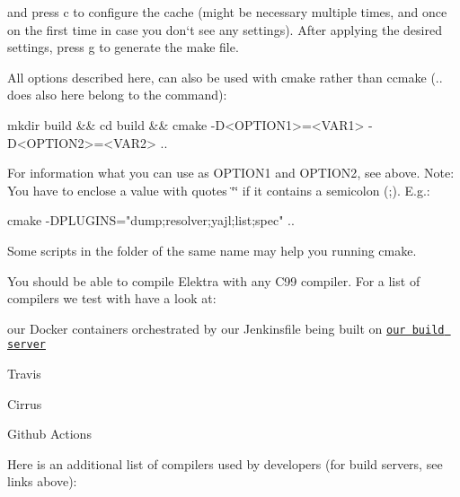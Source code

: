 and press {\ttfamily c} to configure the cache (might be necessary multiple times, and once on the first time in case you don‘t see any settings). After applying the desired settings, press {\ttfamily g} to generate the make file.

All options described here, can also be used with {\ttfamily cmake} rather than {\ttfamily ccmake} ({\ttfamily ..} does also here belong to the command)\+:


\begin{DoxyCode}
mkdir build && cd build && cmake -D<OPTION1>=<VAR1> -D<OPTION2>=<VAR2> ..
\end{DoxyCode}


For information what you can use as {\ttfamily O\+P\+T\+I\+O\+N1} and {\ttfamily O\+P\+T\+I\+O\+N2}, see above. Note\+: You have to enclose a value with quotes {\ttfamily \char`\"{}\char`\"{}} if it contains a semicolon ({\ttfamily ;}). E.\+g.\+:


\begin{DoxyCode}
cmake -DPLUGINS="dump;resolver;yajl;list;spec" ..
\end{DoxyCode}


Some scripts in the folder of the same name may help you running cmake.

You should be able to compile Elektra with any C99 compiler. For a list of compilers we test with have a look at\+:


\begin{DoxyItemize}
\item our Docker containers orchestrated by our Jenkinsfile being built on \href{https://build.libelektra.org/}{\tt our build server}
\item Travis
\item Cirrus
\item Github Actions
\end{DoxyItemize}

Here is an additional list of compilers used by developers (for build servers, see links above)\+:

